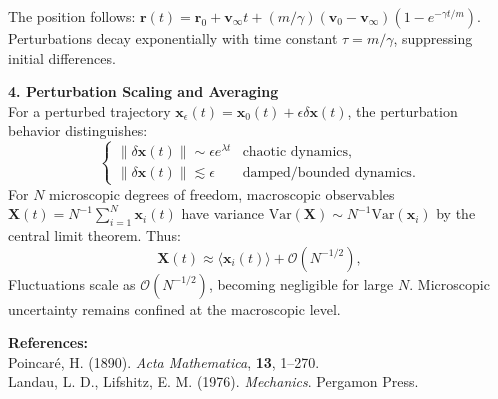 \begin{technical}
The position follows: $\mathbf{r}(t) = \mathbf{r}_0 + \mathbf{v}_\infty t + (m/\gamma)(\mathbf{v}_0 - \mathbf{v}_\infty)(1 - e^{-\gamma t/m})$. Perturbations decay exponentially with time constant $\tau = m/\gamma$, suppressing initial differences.

\textbf{4. Perturbation Scaling and Averaging}\\
For a perturbed trajectory $\mathbf{x}_\epsilon(t) = \mathbf{x}_0(t) + \epsilon \delta \mathbf{x}(t)$, the perturbation behavior distinguishes:
\[
\begin{cases}
\|\delta \mathbf{x}(t)\| \sim \epsilon e^{\lambda t} & \text{chaotic dynamics,} \\[0.5em]
\|\delta \mathbf{x}(t)\| \lesssim \epsilon & \text{damped/bounded dynamics.}
\end{cases}
\]
For $N$ microscopic degrees of freedom, macroscopic observables $\mathbf{X}(t) = N^{-1} \sum_{i=1}^N \mathbf{x}_i(t)$ have variance $\mathrm{Var}(\mathbf{X}) \sim N^{-1} \mathrm{Var}(\mathbf{x}_i)$ by the central limit theorem. Thus:
\[
\mathbf{X}(t) \approx \langle \mathbf{x}_i(t) \rangle + \mathcal{O}(N^{-1/2}),
\]
Fluctuations scale as $\mathcal{O}(N^{-1/2})$, becoming negligible for large $N$. Microscopic uncertainty remains confined at the macroscopic level.

\textbf{References:}\\
Poincaré, H. (1890). \emph{Acta Mathematica}, \textbf{13}, 1–270.\\
Landau, L. D., Lifshitz, E. M. (1976). \emph{Mechanics}. Pergamon Press.
\end{technical}
